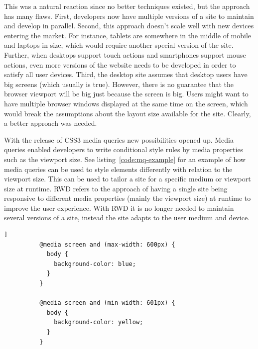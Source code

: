 \documentclass[a4paper,11pt]{kth-mag}
\begin{document}
        This was a natural reaction since no better techniques existed, but the approach has many flaws.
        First, developers now have multiple versions of a site to maintain and develop in parallel.
        Second, this approach doesn't scale well with new devices entering the market.
        For instance, tablets are somewhere in the middle of mobile and laptops in size, which would require another special version of the site.
        Further, when desktops support touch actions and smartphones support mouse actions, even more versions of the website needs to be developed in order to satisfy all user devices.
        Third, the desktop site assumes that desktop users have big screens (which usually is true).
        However, there is no guarantee that the \gls{browser} \gls{viewport} will be big just because the screen is big.
        Users might want to have multiple \gls{browser} windows displayed at the same time on the screen, which would break the assumptions about the layout size available for the site.
        Clearly, a better approach was needed.

        With the release of \gls{CSS3} \gls{media queries} new possibilities opened up.
        Media queries enabled developers to write conditional style rules by media properties such as the \gls{viewport} size.
        See listing~\ref{code:mq-example} for an example of how \gls{media queries} can be used to style \glspl{element} differently with relation to the viewport size.
        This can be used to tailor a site for a specific medium or \gls{viewport} size at runtime.
        \gls{RWD} refers to the approach of having a single site being \gls{responsive} to different media properties (mainly the \gls{viewport} size) at runtime to improve the user experience.
        With \gls{RWD} it is no longer needed to maintain several versions of a site, instead the site adapts to the user medium and device.

        \begin{lstlisting}[gobble=10,label={code:mq-example},caption={The above \gls{CSS} styles the body of the website blue if the \gls{viewport} is less or equal to 600 pixels wide, and yellow otherwise.},captionpos=b]]
          @media screen and (max-width: 600px) {
            body {
              background-color: blue;
            }
          }

          @media screen and (min-width: 601px) {
            body {
              background-color: yellow;
            }
          }
        \end{lstlisting}
\end{document}
